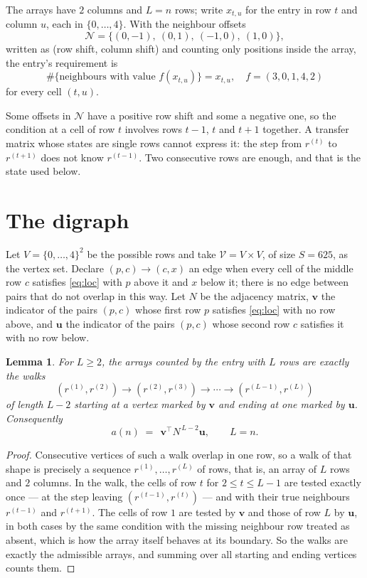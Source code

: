 \documentclass[11pt,a4paper]{article}
\theoremstyle{plain}
\newtheorem{lemma}[theorem]{Lemma}
\theoremstyle{definition}
\begin{document}
The arrays have $2$ columns and $L=n$ rows; write $x_{t,u}$ for the entry in
row $t$ and column $u$, each in $\{0,\dots,4\}$. With the neighbour offsets
\[
\mathcal N=\{(0,-1),\ (0,1),\ (-1,0),\ (1,0)\},
\]
written as (row shift, column shift) and counting only positions inside the array, the
entry's requirement is
\begin{equation}\label{eq:loc}
\#\{\text{neighbours with value }f(x_{t,u})\}=x_{t,u},\quad f=(3,0,1,4,2)
\end{equation}
for every cell $(t,u)$.

Some offsets in $\mathcal N$ have a positive row shift and some a negative one, so the
condition at a cell of row $t$ involves rows $t-1$, $t$ and $t+1$ together. A transfer
matrix whose states are single rows cannot express it: the step from $r^{(t)}$ to
$r^{(t+1)}$ does not know $r^{(t-1)}$. Two consecutive rows are enough, and that is
the state used below.

\section{The digraph}

Let $V=\{0,\dots,4\}^{2}$ be the possible rows and take
$\mathcal V=V\times V$, of size $S=625$, as the vertex set. Declare $(p,c)\to(c,x)$ an edge
when every cell of the middle row $c$ satisfies \eqref{eq:loc} with $p$ above it and $x$
below it; there is no edge between pairs that do not overlap in this way. Let $N$ be the
adjacency matrix, $\mathbf{v}$ the indicator of the pairs $(p,c)$ whose first row $p$
satisfies \eqref{eq:loc} with no row above, and $\mathbf{u}$ the indicator of
the pairs $(p,c)$ whose second row $c$ satisfies it with no row below.

\begin{lemma}\label{lem:walk}
For $L\ge2$, the arrays counted by the entry with $L$ rows are exactly the walks
\[
(r^{(1)},r^{(2)})\to(r^{(2)},r^{(3)})\to\cdots\to(r^{(L-1)},r^{(L)})
\]
of length $L-2$ starting at a vertex marked by $\mathbf{v}$ and ending at one marked by
$\mathbf{u}$. Consequently
\[
a(n)\;=\;\,\mathbf{v}^{\!\top}N^{\,L-2}\mathbf{u},\qquad L=n .
\]
\end{lemma}

\begin{proof}
Consecutive vertices of such a walk overlap in one row, so a walk of that shape is
precisely a sequence $r^{(1)},\dots,r^{(L)}$ of rows, that is, an array of $L$ rows
and $2$ columns. In the walk, the cells of row $t$ for $2\le t\le L-1$ are tested
exactly once --- at the step leaving $(r^{(t-1)},r^{(t)})$ --- and with their true
neighbours $r^{(t-1)}$ and $r^{(t+1)}$. The cells of row $1$ are tested by
$\mathbf{v}$ and those of row $L$ by $\mathbf{u}$, in both cases by the same condition
with the missing neighbour row treated as absent, which is how the array itself behaves at
its boundary. So the walks are exactly the admissible arrays, and summing over all starting
and ending vertices counts them.
\end{proof}
\end{document}
